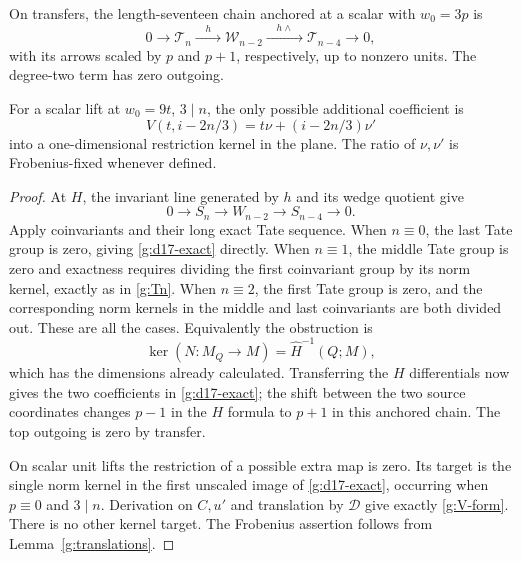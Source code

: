 \begin{lemma}\label{g:d17}
On transfers, the length-seventeen chain anchored at a scalar
with $w_0=3p$ is
\begin{equation}\label{g:d17-exact}
 0\longrightarrow\mathcal T_n
 \xrightarrow{\quad h\quad}\mathcal W_{n-2}
 \xrightarrow{\quad h\wedge\quad}\mathcal T_{n-4}
 \longrightarrow0,
\end{equation}
with its arrows scaled by $p$ and $p+1$, respectively, up to
nonzero units.  The degree-two term has zero outgoing.

For a scalar lift at $w_0=9t$, $3\mid n$, the only possible
additional coefficient is
\begin{equation}\label{g:V-form}
 V(t,i-2n/3)=t\nu+(i-2n/3)\nu'
\end{equation}
into a one-dimensional restriction kernel in the plane.  The
ratio of $\nu,\nu'$ is Frobenius-fixed whenever defined.
\end{lemma}

\begin{proof}
At $H$, the invariant line generated by $h$ and its wedge
quotient give
\[
 0\longrightarrow S_n\longrightarrow W_{n-2}
 \longrightarrow S_{n-4}\longrightarrow0.
\]
Apply coinvariants and their long exact Tate sequence.
When $n\equiv0$, the last Tate group is zero, giving
\eqref{g:d17-exact} directly.  When $n\equiv1$, the
middle Tate group is zero and exactness requires dividing
the first coinvariant group by its norm kernel, exactly as
in \eqref{g:Tn}.  When $n\equiv2$, the first Tate group
is zero, and the corresponding norm kernels in the middle
and last coinvariants are both divided out.  These are
all the cases.  Equivalently the obstruction is
\[
 \ker(N:M_Q\longrightarrow M)
 =\widehat H^{-1}(Q;M),
\]
which has the dimensions already calculated.  Transferring
the $H$ differentials now gives the two coefficients in
\eqref{g:d17-exact}; the shift between the two source
coordinates changes $p-1$ in the $H$ formula to $p+1$
in this anchored chain.  The top outgoing is zero by
transfer.

On scalar unit lifts the restriction of a possible extra
map is zero.  Its target is the single norm kernel in the
first unscaled image of \eqref{g:d17-exact}, occurring
when $p\equiv0$ and $3\mid n$.  Derivation on $C,u'$
and translation by $\mathcal D$ give exactly
\eqref{g:V-form}.  There is no other kernel target.
The Frobenius assertion follows from
Lemma~\ref{g:translations}.
\end{proof}


